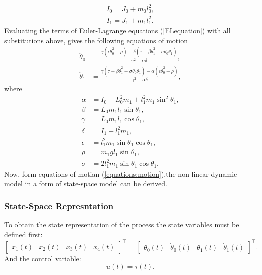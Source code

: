 \begin{subequations}
		\begin{align}
			I_0 = J_0 + m_0l_0^2,\\
			I_1 = J_1 + m_1l_1^2.
		\end{align}
\end{subequations}
Evaluating the terms of Euler-Lagrange equations (\ref{ELequation}) with all substitutions above, gives the following equations of motion
\begin{subequations}\label{equations:motion}
	\begin{align}
	\ddot{\theta}_0 &= \frac{\gamma(\epsilon\dot{\theta}_0^2+\rho)-\delta(\tau+\beta\dot{\theta}_1^2-\sigma\dot{\theta}_0\dot{\theta}_1)}{\gamma^2-\alpha\delta}\label{motion1},\\
	\ddot{\theta}_1 &= \frac{\gamma(\tau+\beta\dot{\theta}_1^2-\sigma\dot{\theta}_0\dot{\theta}_1)-\alpha(\epsilon\dot{\theta}_0^2+\rho)}{\gamma^2-\alpha\delta}\label{motion2},
	\end{align}
\end{subequations}
where
\begin{subequations}
	\begin{align}
	\alpha &= I_0+L_0^2m_1+l_1^2m_1\sin^2\theta_1,\\
	\beta &= L_0m_1l_1\sin\theta_1, \\
	\gamma &= L_0m_1l_1\cos\theta_1,\\
	\delta &= I_1+l_1^2m_1,\\
	\epsilon &= l^2_1m_1\sin\theta_1\cos\theta_1,\\
	\rho &= m_1gl_1\sin\theta_1,\\
	\sigma &= 2l^2_1m_1\sin\theta_1\cos\theta_1.
	\end{align}
\end{subequations}
Now, form equations of motian (\ref{equations:motion}),the non-linear dynamic model in a form of state-space model can be derived.
\subsubsection{State-Space Represntation} 
To obtain the state representation of the process the state variables must be defined first:
\begin{equation}
\begin{bmatrix}
x_1(t)&x_2(t)&x_3(t)&x_4(t)
\end{bmatrix}^\intercal = 
\begin{bmatrix}
\theta_0(t)&\dot{\theta}_0(t)&\theta_1(t)&\dot{\theta}_1(t)
\end{bmatrix}^\intercal.
\end{equation}
And the control variable:
\begin{equation} u(t) = \tau(t). \end{equation}


